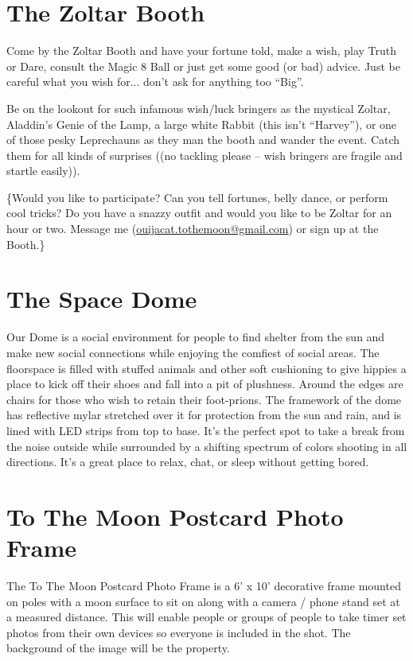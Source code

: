 \section*{The Zoltar Booth}
Come by the Zoltar Booth and have your fortune told, make a wish, play Truth or Dare, consult the Magic 8 Ball or just get some good (or bad) advice. Just be careful what you wish for... don’t ask for anything too ``Big''. 

Be on the lookout for such infamous wish/luck bringers as the mystical Zoltar, Aladdin’s Genie of the Lamp, a large white Rabbit (this isn’t ``Harvey''), or one of those pesky Leprechauns as they man the booth and wander the event. Catch them for all kinds of surprises ((no tackling please – wish bringers are fragile and startle easily)).

\{Would you like to participate? Can you tell fortunes, belly dance, or perform cool tricks? Do you have a snazzy outfit and would you like to be Zoltar for an hour or two. Message me (\url{ouijacat.tothemoon@gmail.com}) or sign up at the Booth.\}
 
\section*{The Space Dome}
Our Dome is a social environment for people to find shelter from the sun and make new social connections while enjoying the comfiest of social areas. The floorspace is filled with stuffed animals and other soft cushioning to give hippies a place to kick off their shoes and fall into a pit of plushness. Around the edges are chairs for those who wish to retain their foot-prions. The framework of the dome has reflective mylar stretched over it for protection from the sun and rain, and is lined with LED strips from top to base. It's the perfect spot to take a break from the noise outside while surrounded by a shifting spectrum of colors shooting in all directions. It's a great place to relax, chat, or sleep without getting bored.


\section*{To The Moon Postcard Photo Frame}
The To The Moon Postcard Photo Frame is a 6' x 10' decorative frame mounted on poles with a moon surface to sit on along with a camera / phone stand set at a measured distance.  This will enable people or groups of people to take timer set photos from their own devices so everyone is included in the shot.  The background of the image will be the property.   


